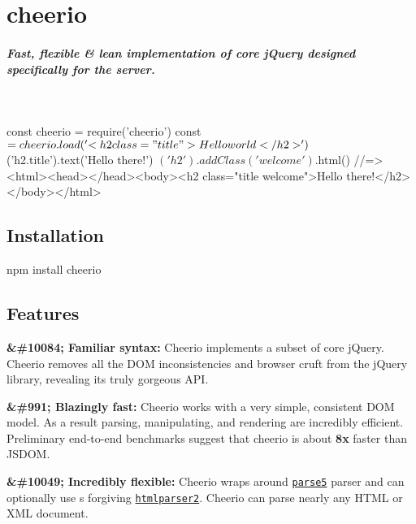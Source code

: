 \section*{cheerio}

\subparagraph*{Fast, flexible \& lean implementation of core j\+Query designed specifically for the server.}

 \href{http://travis-ci.org/cheeriojs/cheerio}{\tt } \href{https://coveralls.io/r/cheeriojs/cheerio}{\tt } \href{https://gitter.im/cheeriojs/cheerio?utm_source=badge&utm_medium=badge&utm_campaign=pr-badge&utm_content=badge}{\tt } \href{#backers}{\tt } \href{#sponsors}{\tt } 

~\newline



\begin{DoxyCode}
const cheerio = require('cheerio')
const $ = cheerio.load('<h2 class="title">Hello world</h2>')

$('h2.title').text('Hello there!')
$('h2').addClass('welcome')

$.html()
//=> <html><head></head><body><h2 class="title welcome">Hello there!</h2></body></html>
\end{DoxyCode}


\subsection*{Installation}

{\ttfamily npm install cheerio}

\subsection*{Features}

{\bfseries \&\#10084; Familiar syntax\+:} Cheerio implements a subset of core j\+Query. Cheerio removes all the D\+OM inconsistencies and browser cruft from the j\+Query library, revealing its truly gorgeous A\+PI.

{\bfseries \&\#991; Blazingly fast\+:} Cheerio works with a very simple, consistent D\+OM model. As a result parsing, manipulating, and rendering are incredibly efficient. Preliminary end-\/to-\/end benchmarks suggest that cheerio is about {\bfseries 8x} faster than J\+S\+D\+OM.

{\bfseries \&\#10049; Incredibly flexible\+:} Cheerio wraps around \href{https://github.com/inikulin/parse5}{\tt parse5} parser and can optionally use \textquotesingle{}s forgiving \href{https://github.com/fb55/htmlparser2/}{\tt htmlparser2}. Cheerio can parse nearly any H\+T\+ML or X\+ML document.


